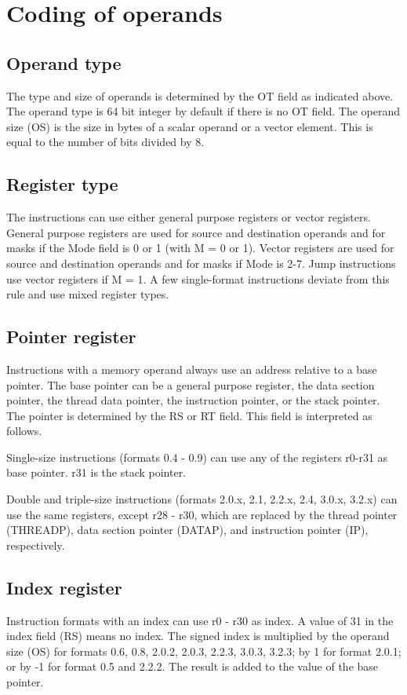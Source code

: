 \documentclass[forwardcom.tex]{subfiles}
\begin{document}
\vspace{2mm}
\section{Coding of operands}
\subsection{Operand type}
The type and size of operands is determined by the OT field as indicated above. The operand type is 64 bit integer by default if there is no OT field. The operand size (OS) is the size in bytes of a scalar operand or a vector element. This is equal to the number of bits divided by 8.

\subsection{Register type}
The instructions can use either general purpose registers or vector registers. General purpose registers are used for source and destination operands and for masks if the Mode field is 0 or 1 (with M = 0 or 1). Vector registers are used for source and destination operands and for masks if Mode is 2-7. Jump instructions use vector registers if M = 1. A few single-format instructions deviate from this rule and use mixed register types.

\subsection{Pointer register}
Instructions with a memory operand always use an address relative to a base pointer. The base pointer can be a general purpose register, the data section pointer, the thread data pointer,
the instruction pointer, or the stack pointer. The pointer is determined by the RS or RT field. This field is interpreted as follows.
\vspace{2mm}

Single-size instructions (formats 0.4 - 0.9) can use any of the registers r0-r31 as base pointer. r31 is the stack pointer.
\vspace{2mm}

Double and triple-size instructions (formats 2.0.x, 2.1, 2.2.x, 2.4, 3.0.x, 3.2.x) can use the same registers, except r28 - r30,  which are replaced by the thread pointer (THREADP), data section pointer (DATAP), and instruction pointer (IP), respectively.
\vspace{2mm}

\subsection{Index register}
Instruction formats with an index can use r0 - r30 as index. A value of 31 in the index field (RS) means no index. The signed index is multiplied by the operand size (OS) for formats 0.6, 0.8, 2.0.2, 2.0.3, 2.2.3, 3.0.3, 3.2.3; by 1 for format 2.0.1; or by -1 for format 0.5 and 2.2.2. The result is added to the value of the base pointer.
\end{document}
